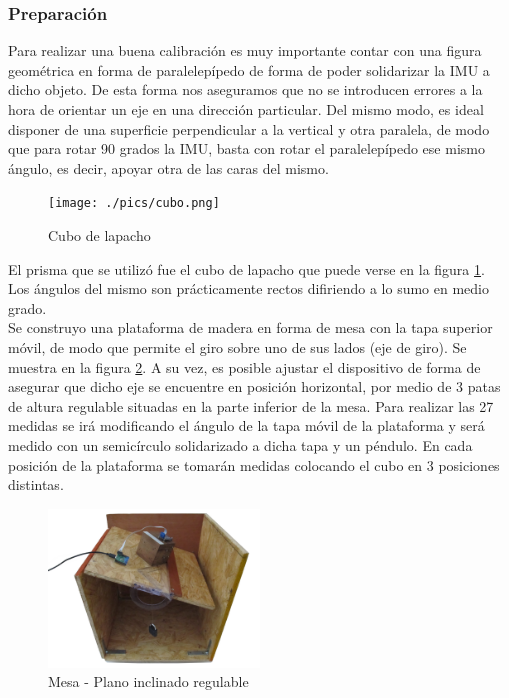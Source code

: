 \documentclass[spanish,12pt,a4paper,titlepage]{report}
\begin{document}
\subsubsection*{Preparación}
Para realizar una buena calibración es muy importante contar con una figura geométrica en forma de paralelepípedo de forma de poder solidarizar la IMU a dicho objeto. De esta forma nos aseguramos que no se introducen errores a la hora de orientar un eje en una dirección particular. Del mismo modo, es ideal disponer de una superficie perpendicular a la vertical y otra paralela, de modo que para rotar 90 grados la IMU, basta con rotar el paralelepípedo ese mismo ángulo, es decir, apoyar otra de las caras del mismo. \\

\begin{figure}
  \vspace{-20pt}
  \begin{center}
    \texttt{[image: ./pics/cubo.png]}
  \end{center}
  \vspace{-20pt}
  \caption{Cubo de lapacho}
  \label{fig:cubo}
\end{figure}

El prisma que se utilizó fue el cubo de lapacho que puede verse en la figura \ref{fig:cubo}. \\
Los ángulos del mismo son prácticamente rectos difiriendo a lo sumo en medio grado. \\

Se construyo una plataforma de madera en forma de mesa con la tapa superior móvil, de modo que permite el giro sobre uno de sus lados (eje de giro). Se muestra en la figura \ref{fig:mesa-flotando}.  A su vez, es posible ajustar el dispositivo de forma de asegurar que dicho eje se encuentre en posición horizontal, por medio de 3 patas de altura regulable situadas en la parte inferior de la mesa. Para realizar las 27 medidas se irá modificando el ángulo de la tapa móvil de la plataforma y será medido con un semicírculo solidarizado a dicha tapa y un péndulo. En cada posición de la plataforma se tomarán medidas colocando el cubo en 3 posiciones distintas.

\begin{figure}[h!]
	\begin{center}
		\includegraphics[width=0.5\textwidth]{./pics/mesa-flotando.jpg}
	\end{center}
	\vspace{-20pt}
	\caption{Mesa - Plano inclinado regulable}
	\label{fig:mesa-flotando}
\end{figure}
\end{document}
